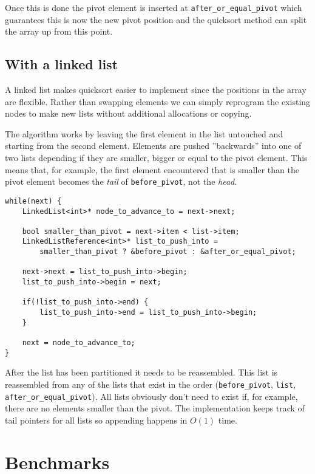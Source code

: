 \documentclass[a4paper,11pt]{article}
\begin{document}
Once this is done the pivot element is inserted at \texttt{after_or_equal_pivot} which guarantees this is now the new pivot position and the quicksort method can split the array up from this point.

\subsection*{With a linked list}

A linked list makes quicksort easier to implement since the positions in the array are flexible. Rather than swapping elements we can simply reprogram the existing nodes to make new lists without additional allocations or copying.

The algorithm works by leaving the first element in the list untouched and starting from the second element.
Elements are pushed ''backwards'' into one of two lists depending if they are smaller, bigger or equal to the pivot element.
This means that, for example, the first element encountered that is smaller than the pivot element becomes the \emph{tail} of \texttt{before_pivot}, not the \emph{head}.

\begin{verbatim}
while(next) {
	LinkedList<int>* node_to_advance_to = next->next;

	bool smaller_than_pivot = next->item < list->item;
	LinkedListReference<int>* list_to_push_into =
		smaller_than_pivot ? &before_pivot : &after_or_equal_pivot;

	next->next = list_to_push_into->begin;
	list_to_push_into->begin = next;

	if(!list_to_push_into->end) {
		list_to_push_into->end = list_to_push_into->begin;
	}

	next = node_to_advance_to;
}
\end{verbatim}

After the list has been partitioned it needs to be reassembled.
This list is reassembled from any of the lists that exist in the order (\texttt{before_pivot}, \texttt{list}, \texttt{after_or_equal_pivot}).
All lists obviously don't need to exist if, for example, there are no elements smaller than the pivot.
The implementation keeps track of tail pointers for all lists so appending happens in $O(1)$ time.

\section*{Benchmarks}
\end{document}
